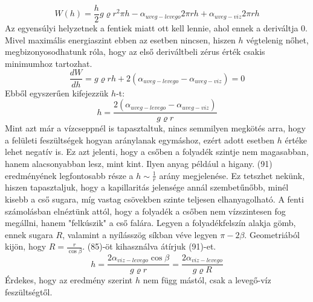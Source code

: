 \documentclass[a4paper,12pt]{article}
\begin{document}
\begin{equation}
W(h)=\frac{h}{2}g\varrho r^2\pi h-\alpha_{uveg-levego}2\pi rh+\alpha_{uveg-viz}2\pi rh
\end{equation}
Az egyensúlyi helyzetnek a fentiek miatt ott kell lennie, ahol ennek a deriváltja 0. Mivel maximális energiaszint ebben az esetben nincsen, hiszen $h$ végtelenig nőhet, megbizonyosodhatunk róla, hogy az első deriváltbeli zérus érték csakis minimumhoz tartozhat.
\begin{equation}
\frac{dW}{dh}=g\varrho rh+2(\alpha_{uveg-levego}-\alpha_{uveg-viz})=0
\end{equation}
Ebből egyszerűen kifejezzük $h$-t:
\begin{equation}
h=\frac{2(\alpha_{uveg-levego}-\alpha_{uveg-viz})}{g\varrho r}
\end{equation}
Mint azt már a vízcseppnél is tapasztaltuk, nincs semmilyen megkötés arra, hogy a felületi feszültségek hogyan aránylanak egymáshoz, ezért adott esetben $h$ értéke lehet negatív is. Ez azt jelenti, hogy a csőben a folyadék szintje nem magasabban, hanem alacsonyabban lesz, mint kint. Ilyen anyag például a higany. (91) eredményének legfontosabb része a $h\sim\frac{1}{r}$ arány megjelenése. Ez tetszhet nekünk, hiszen tapasztaljuk, hogy a kapillaritás jelensége annál szembetűnőbb, minél kisebb a cső sugara, míg vastag csövekben szinte teljesen elhanyagolható.
A fenti számolásban elnéztünk attól, hogy a folyadék a csőben nem vízszintesen fog megállni, hanem "felkúszik" a cső falára. Legyen a folyadékfelszín alakja gömb, ennek sugara $R$, valamint a nyílásszög síkban véve legyen $\pi-2\beta$. Geometriából kijön, hogy $R=\frac{r}{\cos\beta}$. (85)-öt kihasználva átírjuk (91)-et.
\begin{equation}
h=\frac{2\alpha_{viz-levego}\cos\beta}{g\varrho r}=\frac{2\alpha_{viz-levego}}{g\varrho R}
\end{equation}
Érdekes, hogy az eredmény szerint $h$ nem függ mástól, csak a levegő-víz feszültségtől.
\end{document}
